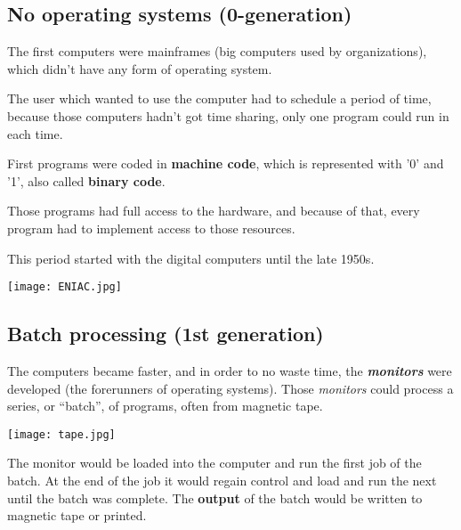 \subsection{No operating systems (0-generation)}
The first computers were mainframes (big computers used by organizations), which didn't have any form of operating system.

The user which wanted to use the computer had to  schedule a period of time, because those computers hadn't got time sharing, only one program could run in each time.

First programs were coded in \textbf{machine code}, which is represented with '0' and '1', also called \textbf{binary code}.

Those programs had full access to the hardware, and because of that, every program had to implement access to those resources.

This period started with the digital computers until the late 1950s.

\begin{center}
    \texttt{[image: ENIAC.jpg]}
    \vspace{-10pt}\vspace{-13pt}
\end{center}


\subsection{Batch processing (1st generation)}
The computers became faster, and in order to no waste time, the \textit{\textbf{monitors}} were developed (the forerunners of operating systems). Those \textit{monitors} could process a series, or “batch”, of programs, often from magnetic tape.

\begin{center}
    \texttt{[image: tape.jpg]}
    \vspace{-10pt}\vspace{-13pt}
\end{center}

The monitor would be loaded into the computer and run the first job of the batch. At the end of the job it would regain control and load and run the next until the batch was complete. The \textbf{output} of the batch would be written to magnetic tape or printed.


